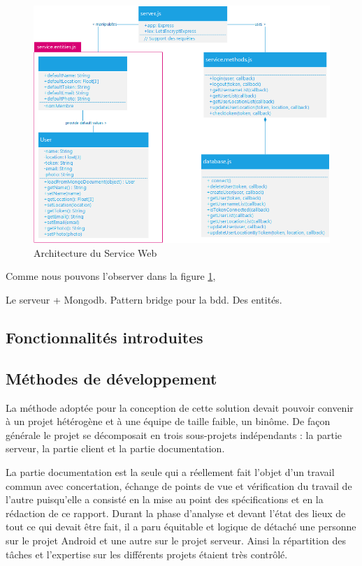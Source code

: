             \begin{figure}[H]
                \centering
                \includegraphics[width=\textwidth]{./img/architecture-service-web.png}
                \caption{Architecture du Service Web}
                \label{asweb}
            \end{figure}

            Comme nous pouvons l'observer dans la figure \ref{asweb}, 


            Le serveur + Mongodb.
            Pattern bridge pour la bdd. Des entités.

    \subsection{Fonctionnalités introduites}



    \subsection{Méthodes de développement}

    La méthode adoptée pour la conception de cette solution devait pouvoir convenir à un projet hétérogène et à une équipe de taille faible, un binôme. De façon générale le projet se décomposait en trois sous-projets indépendants : la partie serveur, la partie client et la partie documentation.

    La partie documentation est la seule qui a réellement fait l’objet d’un travail commun avec concertation, échange de points de vue et vérification du travail de l’autre puisqu’elle a consisté en la mise au point des spécifications et en la rédaction de ce rapport. Durant la phase d’analyse et devant l’état des lieux de tout ce qui devait être fait, il a paru équitable et logique de détaché une personne sur le projet Android et une autre sur le projet serveur. Ainsi la répartition des tâches et l’expertise sur les différents projets étaient très contrôlé.

